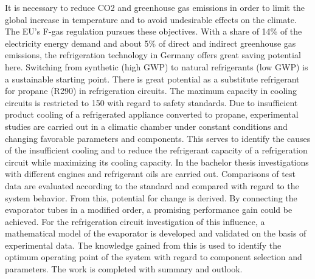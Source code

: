 It is necessary to reduce CO2 and greenhouse gas emissions in order to limit the global increase in temperature and to avoid undesirable effects on the climate. The EU's F-gas regulation pursues these objectives. With a share of \unit{14}{\%} of the electricity energy demand and about \unit{5}{\%} of direct and indirect greenhouse gas emissions, the refrigeration technology in Germany offers great saving potential here. Switching from synthetic (high GWP) to natural refrigerants (low GWP) is a sustainable starting point.
There is great potential as a substitute refrigerant for propane (R290) in refrigeration circuits. The maximum capacity in cooling circuits is restricted to \unit{150}{\gram} with regard to safety standards.
Due to insufficient product cooling of a refrigerated appliance converted to propane, experimental studies are carried out in a climatic chamber under constant conditions and changing favorable parameters and components. This serves to identify the causes of the insufficient cooling and to reduce the refrigerant capacity of a refrigeration circuit while maximizing its cooling capacity.
In the bachelor thesis investigations with different engines and refrigerant oils are carried out. Comparisons of test data are evaluated according to the standard and compared with regard to the system behavior. From this, potential for change is derived.
By connecting the evaporator tubes in a modified order, a promising performance gain could be achieved. For the refrigeration circuit investigation of this influence, a mathematical model of the evaporator is developed and validated on the basis of experimental data.
The knowledge gained from this is used to identify the optimum operating point of the system with regard to component selection and parameters.
The work is completed with summary and outlook.

